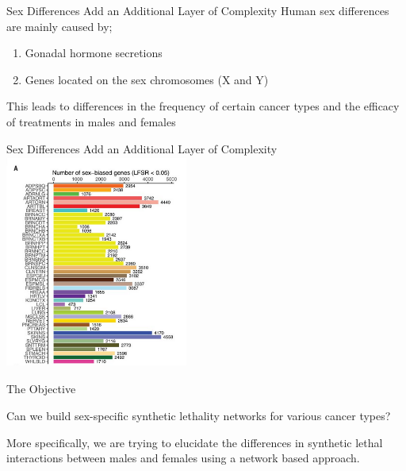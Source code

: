 \documentclass{beamer}
\begin{document}
	\begin{frame}{Sex Differences Add an Additional Layer of Complexity}
		Human sex differences are mainly caused by;
		\begin{enumerate}
			\item Gonadal hormone secretions
			\item Genes located on the sex chromosomes (X and Y) \newline
		\end{enumerate}
	This leads to differences in the frequency of certain cancer types and the efficacy of treatments in males and females
	\end{frame}

	\begin{frame}{Sex Differences Add an Additional Layer of Complexity}
		\centering
		\includegraphics[width=6cm,height=7cm]{sex.png}
	\end{frame}

	\begin{frame}{The Objective}
		\begin{center}
		Can we build sex-specific synthetic lethality networks for various cancer types? \newline
		
		More specifically, we are trying to elucidate the differences in synthetic lethal interactions between males and females using a network based approach.
		\end{center}
	\end{frame}
\end{document}
